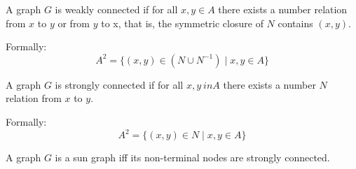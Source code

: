 \begin{definition}
    \begin{subdefinition}
        A graph \(G\) is weakly connected if for all \(x, y \in A\) there exists a number relation from \(x\) to \(y\) or from \(y\) to x, that is, the symmetric closure of \(N\) contains \((x, y)\).
        
        Formally: 
            \[
                A^2 = \{ (x, y) \in (N \cup N^{-1}) \mid x, y \in A \}
            \]
        \label{def:weakly-connected}
    \end{subdefinition}
    
    \begin{subdefinition}
        A graph \(G\) is strongly connected if for all \(x, y \ in A\) there exists a number \(N\) relation from \(x\) to \(y\).
        
        Formally:
            \[
                A^2 = \{ (x, y) \in N \mid x, y \in A \}
            \]
        \label{def:strongly-connected}
    \end{subdefinition}
    
    \begin{subdefinition}
        A graph \(G\) is a sun graph iff its non-terminal nodes are strongly connected.
        \label{def:sun-graph}
    \end{subdefinition}
\end{definition}

